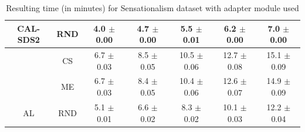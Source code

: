 \begin{table}[htbp]
\begin{tabular*}{\linewidth}{c|c|@{\extracolsep{\fill}}ccccc}
\multirow{-3}{*}{\raggedright\arraybackslash CAL-SDS2} & RND & 4.0 $\pm$ {\small 0.00} & 4.7 $\pm$ {\small 0.00} & 5.5 $\pm$ {\small 0.01} & 6.2 $\pm$ {\small 0.00} & 7.0 $\pm$ {\small 0.00}\\
\midrule
 & CS & 6.7 $\pm$ {\small 0.03} & 8.5 $\pm$ {\small 0.05} & 10.5 $\pm$ {\small 0.06} & 12.7 $\pm$ {\small 0.08} & 15.1 $\pm$ {\small 0.09}\\

 & ME & 6.7 $\pm$ {\small 0.03} & 8.4 $\pm$ {\small 0.05} & 10.4 $\pm$ {\small 0.06} & 12.6 $\pm$ {\small 0.07} & 14.9 $\pm$ {\small 0.09}\\

\multirow{-3}{*}{\raggedright\arraybackslash AL} & RND & 5.1 $\pm$ {\small 0.01} & 6.6 $\pm$ {\small 0.02} & 8.3 $\pm$ {\small 0.02} & 10.1 $\pm$ {\small 0.03} & 12.2 $\pm$ {\small 0.04}\\
\bottomrule
\end{tabular*}
\caption{Resulting time (in minutes) for Sensationalism dataset with adapter module used}
\label{tab:time_full_sensation_10_adapter}
\end{table}
